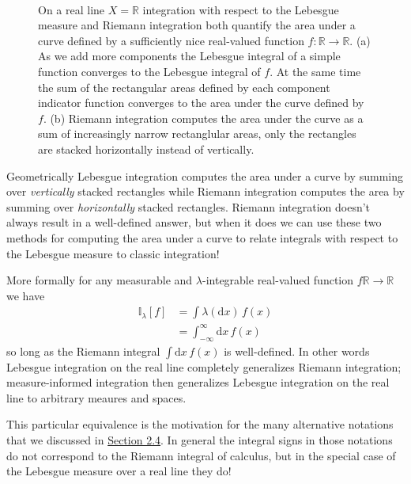 \documentclass[
  letterpaper,
  DIV=11,
  numbers=noendperiod]{scrartcl}
\begin{document}
\begin{figure}
\begin{minipage}[t]{0.90\linewidth}
{}

\subcaption{\label{fig-riemann}}
\end{minipage}%
%
\begin{minipage}[t]{0.05\linewidth}

{\centering 

~

}

\end{minipage}%

\caption{\label{fig-integrate}On a real line \(X = \mathbb{R}\)
integration with respect to the Lebesgue measure and Riemann integration
both quantify the area under a curve defined by a sufficiently nice
real-valued function \(f : \mathbb{R} \rightarrow \mathbb{R}\). (a) As
we add more components the Lebesgue integral of a simple function
converges to the Lebesgue integral of \(f\). At the same time the sum of
the rectangular areas defined by each component indicator function
converges to the area under the curve defined by \(f\). (b) Riemann
integration computes the area under the curve as a sum of increasingly
narrow rectanglular areas, only the rectangles are stacked horizontally
instead of vertically.}

\end{figure}

Geometrically Lebesgue integration computes the area under a curve by
summing over \emph{vertically} stacked rectangles while Riemann
integration computes the area by summing over \emph{horizontally}
stacked rectangles. Riemann integration doesn't always result in a
well-defined answer, but when it does we can use these two methods for
computing the area under a curve to relate integrals with respect to the
Lebesgue measure to classic integration!

More formally for any measurable and \(\lambda\)-integrable real-valued
function \(f \mathbb{R} \rightarrow \mathbb{R}\) we have \begin{align*}
\mathbb{I}_{\lambda}[f]
&= \int \lambda( \mathrm{d} x) \, f(x)
\\
&= \int_{-\infty}^{\infty} \mathrm{d} x \, f(x)
\end{align*} so long as the Riemann integral
\(\int \mathrm{d} x \, f(x)\) is well-defined. In other words Lebesgue
integration on the real line completely generalizes Riemann integration;
measure-informed integration then generalizes Lebesgue integration on
the real line to arbitrary meaures and spaces.

This particular equivalence is the motivation for the many alternative
notations that we discussed in \href{@sec:alt_notations}{Section 2.4}.
In general the integral signs in those notations do not correspond to
the Riemann integral of calculus, but in the special case of the
Lebesgue measure over a real line they do!
\end{document}
